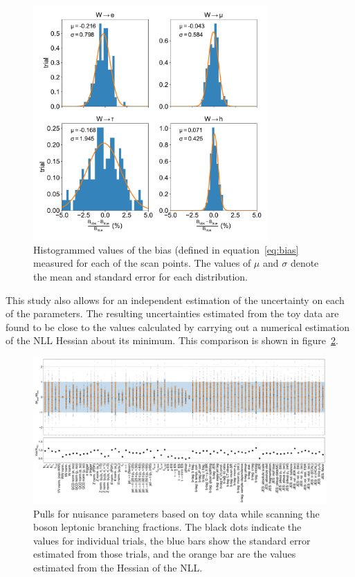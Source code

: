 \begin{figure}[htb!]
    \centering
    \includegraphics[width=0.8\textwidth]{chapters/Analysis/sectionStatisticalAnalysis/figures/beta_bias}
    \caption{Histogrammed values of the bias (defined in
    equation~\ref{eq:bias} measured for each of the scan points.  The
    values of $\mu$ and $\sigma$ denote the mean and standard error for
    each distribution.}
    \label{fig:bias_test}
\end{figure}

This study also allows for an independent estimation of the uncertainty
on each of the parameters.  The resulting uncertainties estimated from
the toy data are found to be close to the values calculated by carrying
out a numerical estimation of the NLL Hessian about its minimum.  This
comparison is shown in figure~\ref{fig:pulls_comparison}.

\begin{figure}[htb!]
    \centering
    \includegraphics[width=0.9\textheight, angle=-90]{chapters/Analysis/sectionStatisticalAnalysis/figures/new_pulls}
    \caption{Pulls for nuisance parameters based on toy data while
        scanning the \PW boson leptonic branching fractions.  The black
        dots indicate the values for individual trials, the blue bars
        show the standard error estimated from those trials, and the
        orange bar are the values estimated from the Hessian of the NLL.}
    \label{fig:pulls_comparison}
\end{figure}




